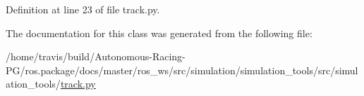 Definition at line 23 of file track.\+py.



The documentation for this class was generated from the following file\+:\begin{DoxyCompactItemize}
\item 
/home/travis/build/\+Autonomous-\/\+Racing-\/\+P\+G/ros.\+package/docs/master/ros\+\_\+ws/src/simulation/simulation\+\_\+tools/src/simulation\+\_\+tools/\hyperlink{track_8py}{track.\+py}\end{DoxyCompactItemize}
